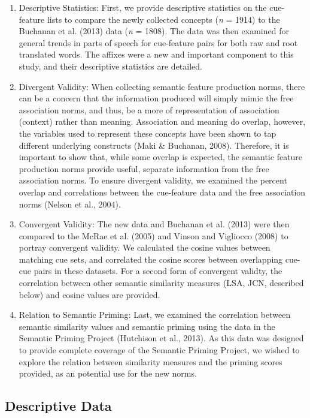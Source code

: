 \documentclass[english,,man]{apa6}
\providecommand{\tightlist}{%
  \setlength{\itemsep}{0pt}\setlength{\parskip}{0pt}}
\begin{document}
\begin{enumerate}
\def\labelenumi{\arabic{enumi})}
\tightlist
\item
  Descriptive Statistics: First, we provide descriptive statistics on the cue-feature lists to compare the newly collected concepts (\emph{n} = 1914) to the Buchanan et al. (2013) data (\emph{n} = 1808). The data was then examined for general trends in parts of speech for cue-feature pairs for both raw and root translated words. The affixes were a new and important component to this study, and their descriptive statistics are detailed.
\item
  Divergent Validity: When collecting semantic feature production norms, there can be a concern that the information produced will simply mimic the free association norms, and thus, be a more of representation of association (context) rather than meaning. Association and meaning do overlap, however, the variables used to represent these concepts have been shown to tap different underlying constructs (Maki \& Buchanan, 2008). Therefore, it is important to show that, while some overlap is expected, the semantic feature production norms provide useful, separate information from the free association norms. To ensure divergent validity, we examined the percent overlap and correlations between the cue-feature data and the free association norms (Nelson et al., 2004).
\item
  Convergent Validity: The new data and Buchanan et al. (2013) were then compared to the McRae et al. (2005) and Vinson and Vigliocco (2008) to portray convergent validity. We calculated the cosine values between matching cue sets, and correlated the cosine scores between overlapping cue-cue pairs in these datasets. For a second form of convergent validty, the correlation between other semantic similarity measures (LSA, JCN, described below) and cosine values are provided.\\
\item
  Relation to Semantic Priming: Last, we examined the correlation between semantic similarity values and semantic priming using the data in the Semantic Priming Project (Hutchison et al., 2013). As this data was designed to provide complete coverage of the Semantic Priming Project, we wished to explore the relation between similarity measures and the priming scores provided, as an potential use for the new norms.
\end{enumerate}

\hypertarget{descriptive-data}{%
\subsection{Descriptive Data}\label{descriptive-data}}
\end{document}
